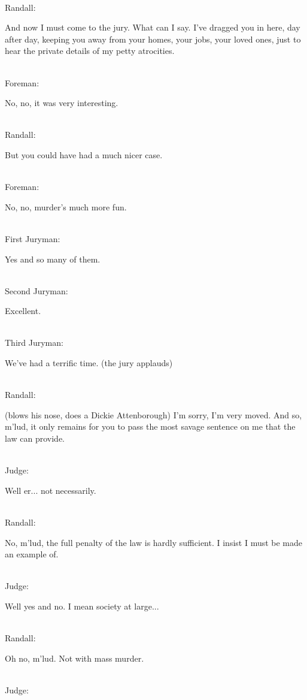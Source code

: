 \documentclass{report}
\begin{document}
\noindent\\ Randall: 	

And now I must come to the jury. What can I say. I've dragged you in here, day after day, keeping you away from your homes, your jobs, your loved ones, just to hear the private details of my petty atrocities.

\noindent\\ Foreman: 	

No, no, it was very interesting.

\noindent\\ Randall: 	

But you could have had a much nicer case.

\noindent\\ Foreman: 	

No, no, murder's much more fun.

\noindent\\ First Juryman: 	

Yes and so many of them.

\noindent\\ Second Juryman: 	

Excellent.

\noindent\\ Third Juryman: 	

We've had a terrific time. (the jury applauds)

\noindent\\ Randall: 	

(blows his nose, does a Dickie Attenborough) I'm sorry, I'm very moved. And so, m'lud, it only remains for you to pass the most savage sentence on me that the law can provide.

\noindent\\ Judge: 	

Well er... not necessarily.

\noindent\\ Randall: 	

No, m'lud, the full penalty of the law is hardly sufficient. I insist I must be made an example of.

\noindent\\ Judge: 	

Well yes and no. I mean society at large...

\noindent\\ Randall: 	

Oh no, m'lud. Not with mass murder.

\noindent\\ Judge: 	
\end{document}
